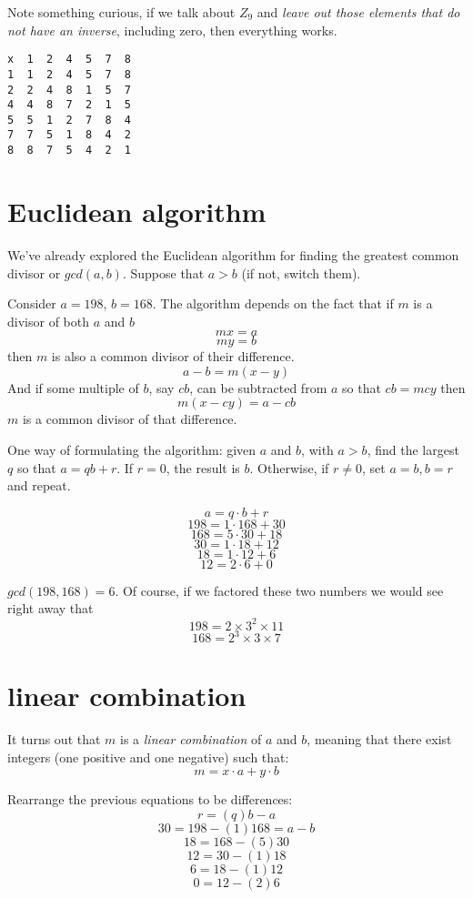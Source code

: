 \documentclass[11pt, oneside]{article}
\begin{document}
Note something curious, if we talk about $Z_9$ and \emph {leave out those elements that do not have an inverse}, including zero, then everything works.

\begin{verbatim}
x  1  2  4  5  7  8
1  1  2  4  5  7  8
2  2  4  8  1  5  7
4  4  8  7  2  1  5
5  5  1  2  7  8  4
7  7  5  1  8  4  2        
8  8  7  5  4  2  1
\end{verbatim}

\section*{Euclidean algorithm}

We've already explored the Euclidean algorithm for finding the greatest common divisor or $gcd(a,b)$.  Suppose that $a > b$ (if not, switch them).  

Consider $a = 198$, $b = 168$.  The algorithm depends on the fact that if $m$ is a divisor of both $a$ and $b$
\[ mx = a \]
\[ my = b \]
then $m$ is also a common divisor of their difference.  
\[ a - b = m(x - y) \]
And if some multiple of $b$, say $cb$, can be subtracted from $a$ so that $cb = mcy$ then
\[ m(x - cy) = a - cb \]
$m$ is a common divisor of that difference.

One way of formulating the algorithm:  given $a$ and $b$, with $a > b$, find the largest $q$ so that $a = qb + r$.  If $r = 0$, the result is $b$.  Otherwise, if $r \ne 0$, set $a = b, b = r$ and repeat.

\[ a = q \cdot b + r \]
\[ 198 = 1 \cdot 168 + 30 \]
\[ 168 = 5 \cdot 30 + 18 \]
\[ 30 = 1 \cdot 18 + 12 \]
\[ 18 = 1 \cdot 12 + 6 \]
\[ 12 = 2 \cdot 6 + 0 \]

$gcd(198,168) = 6$.  Of course, if we factored these two numbers we would see right away that
\[ 198 = 2 \times 3^2 \times 11 \]
\[ 168 = 2^3 \times 3 \times 7 \]

\section*{linear combination}

It turns out that $m$ is a \emph{linear combination} of $a$ and $b$, meaning that there exist integers (one positive and one negative) such that:
\[ m = x \cdot a + y \cdot b \]

Rearrange the previous equations to be differences:
\[ r = (q)b - a \]
\[ 30 = 198 - (1)168 = a - b \]
\[ 18 = 168 - (5)30 \]
\[ 12 = 30 - (1)18 \]
\[ 6 = 18 - (1)12 \]
\[ 0 = 12 - (2)6 \]
\end{document}
